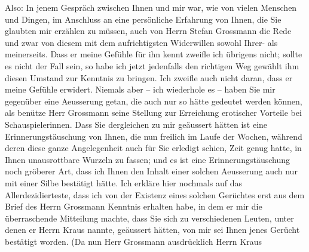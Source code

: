 \pstart
           Also: In jenem Gespräch zwischen Ihnen und mir war, wie von vielen Menschen und
               Dingen, im Anschluss an eine persönliche Erfahrung von Ihnen, die Sie glaubten mir
               erzählen zu müssen, auch von Herrn Stefan
                  Grossmann die Rede und zwar von diesem mit dem aufrichtigsten Widerwillen
               sowohl Ihrer- als meinerseits. Dass er meine Gefühle für ihn kennt zweifle ich
               übrigens nicht; sollte es nicht der Fall sein, so habe ich jetzt jedenfalls den
               richtigen {\pb}Weg gewählt ihm diesen Umstand zur Kenntnis zu
               bringen. Ich zweifle auch nicht daran, dass er meine Gefühle erwidert. Niemals aber –
               ich wiederhole es – haben Sie mir gegenüber eine Aeusserung getan, die auch nur so
               hätte gedeutet werden können, als benütze Herr Grossmann seine Stellung zur Erreichung erotischer Vorteile bei
               Schauspielerinnen. Dass Sie dergleichen zu mir geäussert hätten ist eine
               Erinnerungstäuschung von Ihnen, die nun freilich im Laufe der Wochen, während deren
               diese ganze Angelegenheit \introOben{}auch\introOben{} für Sie erledigt schien, Zeit
               genug hatte, in Ihnen unausrottbare Wurzeln zu fassen; und es ist eine
               Erinnerungstäuschung noch gröberer Art, dass ich Ihnen den Inhalt einer solchen
               Aeusserung auch nur mit einer Silbe bestätigt hätte. Ich erkläre hier nochmals auf
               das Allerdezidierteste, dass ich von der Existenz eines solchen Gerüchtes erst aus
               dem Brief des Herrn Grossmann Kenntnis
               erhalten habe, in dem er mir die überraschende Mitteilung machte, dass Sie sich zu
               verschiedenen Leuten, unter denen er Herrn Kraus nannte, geäussert hätten, von mir sei Ih{\pb}nen
               jenes Gerücht bestätigt worden. (Da nun Herr Grossmann ausdrücklich Herrn Kraus
